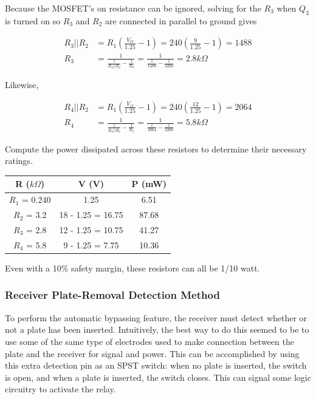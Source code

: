 \documentclass{article}
\begin{document}
		Because the MOSFET's on resistance can be ignored, solving for the $R_3$ when $Q_3$ is turned on so $R_3$ and $R_2$ are connected in parallel to ground gives

		\begin{align}
			R_3 || R_2 &= R_1 \left( \frac{V_O}{1.25} - 1 \right) = 240 \left( \frac{9}{1.25} - 1 \right) = 1488 \\
			R_3 &= \frac{1}{\frac{1}{R_3 || R_2} - \frac{1}{R_2}} = \frac{1}{\frac{1}{1488} - \frac{1}{3200}} = 2.8 k\Omega
		\end{align}

		Likewise, 

		\begin{align}
			R_4 || R_2 &= R_1 \left( \frac{V_O}{1.25} - 1 \right) = 240 \left( \frac{12}{1.25} - 1 \right) = 2064 \\
			R_4 &= \frac{1}{\frac{1}{R_4 || R_2} - \frac{1}{R_2}} = \frac{1}{\frac{1}{2064} - \frac{1}{3200}} = 5.8 k\Omega
		\end{align}

		Compute the power dissipated across these resistors to determine their necessary ratings.

		\begin{center}
		\begin{tabular}{c c|c}
			R ($k\Omega$) & V (V) & P (mW) \\
			\hline
			$R_1$ = 0.240 & 1.25 & 6.51 \\
			$R_2$ = 3.2 & 18 - 1.25 = 16.75 & 87.68 \\
			$R_3$ = 2.8 & 12 - 1.25 = 10.75 & 41.27 \\
			$R_4$ = 5.8 & 9 - 1.25 = 7.75 & 10.36
		\end{tabular}
		\end{center}

		Even with a 10\% safety margin, these resistors can all be 1/10 watt.

		\subsubsection{Receiver Plate-Removal Detection Method}
		To perform the automatic bypassing feature, the receiver must detect whether or not a plate has been inserted. Intuitively, the best way to do this seemed to be to use some of the same type of electrodes used to make connection between the plate and the receiver for signal and power.  This can be accomplished by using this extra detection pin as an SPST switch: when no plate is inserted, the switch is open, and when a plate is inserted, the switch closes.  This can signal some logic circuitry to activate the relay.
\end{document}
